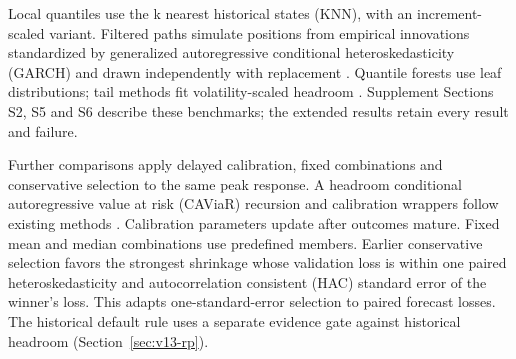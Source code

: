 \documentclass[11pt,a4paper]{article}
\begin{document}
Local quantiles use the k nearest historical states (KNN), with an increment-scaled variant. Filtered paths simulate positions from empirical innovations standardized by generalized autoregressive conditional heteroskedasticity (GARCH) and drawn independently with replacement \citep{hull1998,barone1999}. Quantile forests use leaf distributions; tail methods fit volatility-scaled headroom \citep{meinshausen2006,mcneilfrey2000}. Supplement Sections S2, S5 and S6 describe these benchmarks; the extended results retain every result and failure.

Further comparisons apply delayed calibration, fixed combinations and conservative selection to the same peak response. A headroom conditional autoregressive value at risk (CAViaR) recursion and calibration wrappers follow existing methods \citep{engle2004,gibbs2021}. Calibration parameters update after outcomes mature. Fixed mean and median combinations use predefined members. Earlier conservative selection favors the strongest shrinkage whose validation loss is within one paired heteroskedasticity and autocorrelation consistent (HAC) standard error of the winner's loss. This adapts one-standard-error selection \citep{hastie2009} to paired forecast losses. The historical default rule uses a separate evidence gate against historical headroom (Section~\ref{sec:v13-rp}).
\end{document}
